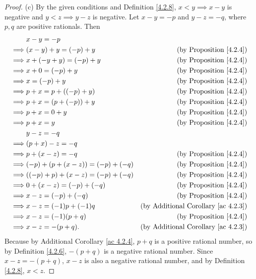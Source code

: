 \begin{proof}{(c)}
By the given conditions and Definition \ref{4.2.8}, \(x < y \implies x - y\) is negative and \(y < z \implies y - z\) is negative.
Let \(x - y = -p\) and \(y - z = -q\), where \(p, q\) are positive rationals.
Then
\begin{align*}
& x - y = -p \\
\implies & (x - y) + y = (-p) + y & \text{(by Proposition \ref{4.2.4})} \\
\implies & x + (-y + y) = (-p) + y & \text{(by Proposition \ref{4.2.4})} \\
\implies & x + 0 = (-p) + y & \text{(by Proposition \ref{4.2.4})} \\
\implies & x = (-p) + y & \text{(by Proposition \ref{4.2.4})} \\
\implies & p + x = p + ((-p) + y) & \text{(by Proposition \ref{4.2.4})} \\
\implies & p + x = (p + (-p)) + y & \text{(by Proposition \ref{4.2.4})} \\
\implies & p + x = 0 + y & \text{(by Proposition \ref{4.2.4})} \\
\implies & p + x = y & \text{(by Proposition \ref{4.2.4})} \\
& y - z = -q \\
\implies & (p + x) - z = -q \\
\implies & p + (x - z) = -q & \text{(by Proposition \ref{4.2.4})} \\
\implies & (-p) + (p + (x - z)) = (-p) + (-q) & \text{(by Proposition \ref{4.2.4})} \\
\implies & ((-p) + p) + (x - z) = (-p) + (-q) & \text{(by Proposition \ref{4.2.4})} \\
\implies & 0 + (x - z) = (-p) + (-q) & \text{(by Proposition \ref{4.2.4})} \\
\implies & x - z = (-p) + (-q) & \text{(by Proposition \ref{4.2.4})} \\
\implies & x - z = (-1)p + (-1)q & \text{(by Additional Corollary \ref{ac 4.2.3})} \\
\implies & x - z = (-1)(p + q) & \text{(by Proposition \ref{4.2.4})} \\
\implies & x - z = -(p + q). & \text{(by Additional Corollary \ref{ac 4.2.3})}
\end{align*}
Because by Additional Corollary \ref{ac 4.2.4}, \(p + q\) is a positive rational number, so by Definition \ref{4.2.6}, \(-(p + q)\) is a negative rational number.
Since \(x - z = -(p + q)\), \(x - z\) is also a negative rational number, and by Definition \ref{4.2.8}, \(x < z\).
\end{proof}

